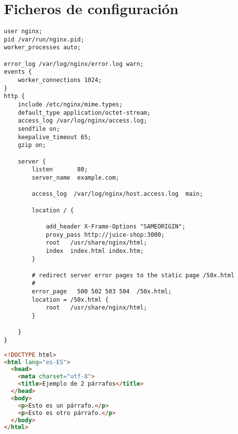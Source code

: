 \section{Ficheros de configuración}

\begin{lstlisting}[label={lst:nginx_config},caption={Ejemplo de fichero de configuración de NGINX}]
user nginx;
pid /var/run/nginx.pid;
worker_processes auto;

error_log /var/log/nginx/error.log warn;
events {
    worker_connections 1024;
}
http {
    include /etc/nginx/mime.types;
    default_type application/octet-stream;
    access_log /var/log/nginx/access.log;
    sendfile on;
    keepalive_timeout 65;
    gzip on;

    server {
        listen       80;
        server_name  example.com;

        access_log  /var/log/nginx/host.access.log  main;

        location / {

            add_header X-Frame-Options "SAMEORIGIN";
            proxy_pass http://juice-shop:3000;
            root   /usr/share/nginx/html;
            index  index.html index.htm;
        }

        # redirect server error pages to the static page /50x.html
        #
        error_page   500 502 503 504  /50x.html;
        location = /50x.html {
            root   /usr/share/nginx/html;
        }

    }
}
\end{lstlisting}

\begin{lstlisting}[language=html, label={lst:simple_html_web},caption={Web sencilla realizada en HTML puro}]
<!DOCTYPE html>
<html lang="es-ES">
  <head>
    <meta charset="utf-8">
    <title>Ejemplo de 2 párrafos</title>
  </head>
  <body>
    <p>Esto es un párrafo.</p>
    <p>Esto es otro párrafo.</p>
  </body>
</html>
\end{lstlisting}

